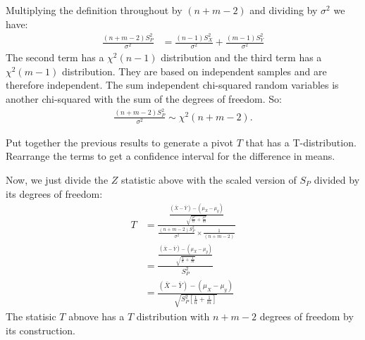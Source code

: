 
Multiplying the definition throughout by $(n + m - 2)$ and dividing by $\sigma^2$
we have:
\begin{align*}
\frac{(n + m - 2) S_P^2}{\sigma^2} &= \frac{(n - 1) S_X^2}{\sigma^2} + \frac{(m - 1) S_Y^2}{\sigma^2}
\end{align*}
The second term has a $\chi^2(n-1)$ distribution and the third term has a 
$\chi^2(m-1)$ distribution. They are based on independent samples and are
therefore independent. The sum independent chi-squared random variables is
another chi-squared with the sum of the degrees of freedom. So:
\begin{align*}
\frac{(n + m - 2) S_P^2}{\sigma^2} \sim \chi^2(n + m - 2).
\end{align*}


Put together the previous results to generate a pivot $T$ that has a T-distribution.
Rearrange the terms to get a confidence interval for the difference in means.


Now, we just divide the $Z$ statistic above with the scaled version of $S_P$ 
divided by its degrees of freedom:
\begin{align*}
T &= \frac{
  \frac{(\bar{X} - \bar{Y}) - (\mu_X - \mu_y)}{\sqrt{\frac{\sigma^2}{n} + \frac{\sigma^2}{m}}}
}{
  \frac{(n + m - 2) S_P^2}{\sigma^2} \times \frac{1}{(n + m - 2)}
} \\
&= \frac{
  \frac{(\bar{X} - \bar{Y}) - (\mu_X - \mu_y)}{\sqrt{\frac{1}{n} + \frac{1}{m}}}
}{
  S_P^2
} \\
&= \frac{(\bar{X} - \bar{Y}) - (\mu_X - \mu_y)}{\sqrt{S_P^2 \left[\frac{1}{n} + \frac{1}{m}\right]}}
\end{align*}
The statisic $T$ abnove has a $T$ distribution with $n + m - 2$ degrees of freedom
by its construction.